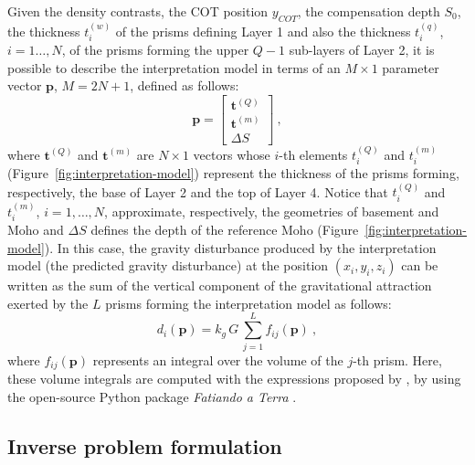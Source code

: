 \documentclass[manuscript]{geophysics}
\begin{document}
Given the density contrasts, the COT position $y_{COT}$, the compensation
depth $S_{0}$, the thickness $t^{(w)}_{i}$ of the prisms defining Layer 1 and 
also the thickness $t^{(q)}_{i}$, $i = 1 \dots, N$, of the prisms forming the 
upper $Q-1$ sub-layers of Layer 2, it is possible to describe the interpretation
model in terms of an $M \times 1$ parameter vector $\mathbf{p}$, $M = 2N + 1$, defined
as follows:
\begin{equation}
\mathbf{p} = \begin{bmatrix}
\mathbf{t}^{(Q)} \\
\mathbf{t}^{(m)} \\
\Delta S
\end{bmatrix} \: ,
\label{eq:parameter-vector}
\end{equation}
where $\mathbf{t}^{(Q)}$ and $\mathbf{t}^{(m)}$ are $N \times 1$ vectors whose $i$-th
elements $t^{(Q)}_{i}$ and $t^{(m)}_{i}$ (Figure~\ref{fig:interpretation-model}) 
represent the thickness of the
prisms forming, respectively, the base of Layer 2 and the top of Layer 4.
Notice that $t^{(Q)}_{i}$ and $t^{(m)}_{i}$, $i = 1, \dots, N$, approximate, respectively, the 
geometries of basement and Moho and $\Delta S$ defines the depth of the
reference Moho (Figure~\ref{fig:interpretation-model}).
In this case, the gravity disturbance produced by the interpretation model (the
predicted gravity disturbance) at the position $(x_{i}, y_{i}, z_{i})$ can be written
as the sum of the vertical component of the gravitational attraction exerted by the $L$
prisms forming the interpretation model as follows:
\begin{equation}
d_{i}(\mathbf{p}) = k_{g} \, G \, \sum_{j = 1}^{L} f_{ij}(\mathbf{p}) \: ,
\label{eq:ith-predicted-data}
\end{equation}
where $f_{ij}(\mathbf{p})$ represents an integral over the volume of the $j$-th 
prism. Here, these volume integrals are computed with the expressions proposed 
by \citet{nagy-etal2000}, by using the open-source Python package 
\textit{Fatiando a Terra} \citep{uieda-etal2013}.


\subsection{Inverse problem formulation}
\end{document}
